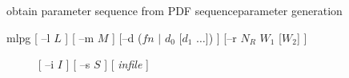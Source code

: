 % 
% 
% 
% 
%                                                                        
%
%
{obtain parameter sequence from PDF sequence}{parameter generation}

\def\bmath#1{\mbox{\boldmath{$#1$}}}
\def\bc{\bmath{c}}
\def\bo{\bmath{o}}
\def\bC{\bmath{C}}
\def\bO{\bmath{O}}
\def\bU{\bmath{U}}
\def\bmu{\bmath{\mu}}

\begin{synopsis}
	\item [mlpg] [ --l $L$ ] [ --m $M$ ] 
		[--d ($fn$ $|$ $d_0$ [$d_1$ $\ldots$]) ]
		[--r $N_R$ $W_1$ [$W_2$] ]
	\item [\ ~~~~] [ --i $I$ ] [ --s $S$ ] [ {\em infile} ] 
\end{synopsis}

